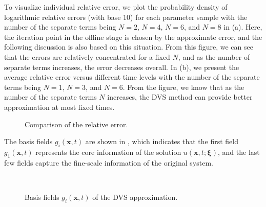 \documentclass[10pt,a4paper]{article}
\numberwithin{equation}{section}
\numberwithin{lemma}{section}
\numberwithin{example}{section}
\numberwithin{definition}{section}
\numberwithin{assumption}{section}
\numberwithin{theorem}{section}
\numberwithin{proposition}{section}
\numberwithin{corollary}{section}
\numberwithin{remark}{section}
\begin{document}
To visualize individual relative error, we plot the probability density of logarithmic relative errors (with base 10) for each parameter sample with the number of the separate terms being  $N=2$, $N=4$, $N=6$, and $N=8$ in (a). 
Here, the iteration point in the offline stage is chosen by the approximate error, and the following discussion is also based on this situation.
From this figure, we can see that the errors are relatively concentrated for a fixed $N$, and as the number of separate terms increases, the error decreases overall.
In (b), we present the average relative error versus different time levels with the number of the separate terms being $N=1$, $N=3$, and $N=6$. 
From the figure, we know that as the number of the separate terms $N$ increases, the DVS method can provide better approximation at most fixed times.
\begin{figure}[htbp]
    \centering
     \quad 
    \caption{Comparison of the relative error.}
    \label{fig-rd.2}
\end{figure}






The basis fields $g_i(\bm{x},t)$ are shown in , which indicates that the first field $g_1(\bm{x},t)$ represents the core information of the solution $u(\bm{x},t;\bm{\xi})$, and the last few fields capture the fine-scale information of the original system.
\begin{figure}[htbp]
    \centering
    \\
    \caption{Basis fields $g_i(\bm{x},t)$ of the DVS approximation.}
    \label{fig_rd.4}
\end{figure}
\end{document}
